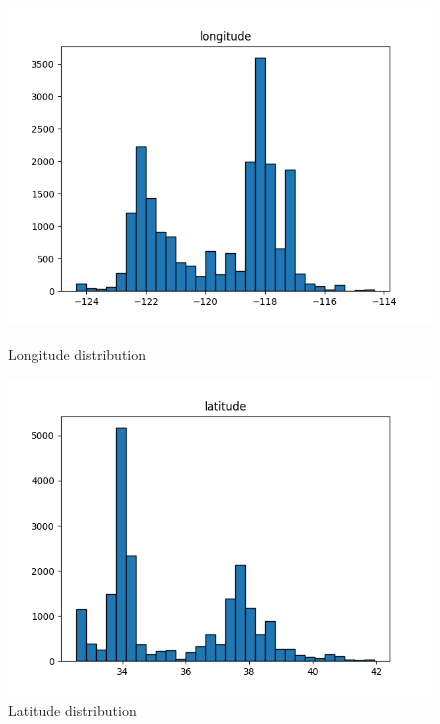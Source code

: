 \documentclass[a4paper, 11pt]{article}
\begin{document}
\begin{figure}[htbp]
    \centering
    \begin{minipage}{0.45\textwidth}
        \centering
        \includegraphics[width=\linewidth]{figs/longitude_distribution.png}
        \caption{Longitude distribution}
        \label{fig:longitude_distribution}
    \end{minipage}\hfill
    \begin{minipage}{0.45\textwidth}
        \centering
        \includegraphics[width=\linewidth]{figs/latitude_distribution.png}
        \caption{Latitude distribution}
        \label{fig:latitude_distribution}
    \end{minipage}
    

\end{figure}
\end{document}
